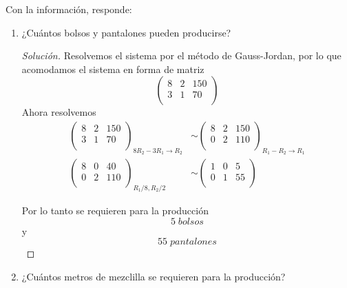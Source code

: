\documentclass[12pt]{article}
\newenvironment{solution}{\begin{proof}[Solución]}{\end{proof}}
\begin{document}
\begin{enumerate}
    Con la información, responde: 
    \vspace*{10mm}
    \begin{enumerate}
        \item ¿Cuántos bolsos y pantalones pueden producirse?
        \begin{solution}
            Resolvemos el sistema por el método de Gauss-Jordan, por lo que acomodamos el sistema en forma de matriz \[\left(\begin{array}{cc|c}  
                8 & 2 & 150 \\  
                3 & 1 & 70  \\ 
            \end{array}\right)\] Ahora resolvemos \begin{align*}
                \left(\begin{array}{cc|c}  
                    8 & 2 & 150 \\  
                    3 & 1 & 70  \\ 
                \end{array}\right)_{8R_2-3R_1 \rightarrow R_2} &\sim \left(\begin{array}{cc|c}  
                    8 & 2 & 150 \\  
                    0 & 2 & 110  \\ 
                \end{array}\right)_{R_1-R_2 \rightarrow R_1} \\
                \left(\begin{array}{cc|c}  
                    8 & 0 & 40 \\  
                    0 & 2 & 110  \\ 
                \end{array}\right)_{R_1/8, R_2/2} &\sim \left(\begin{array}{cc|c}  
                    1 & 0 & 5 \\  
                    0 & 1 & 55  \\ 
                \end{array}\right)
            \end{align*}

            Por lo tanto se requieren para la producción \[5 \; bolsos\] y \[55 \; pantalones\]
        \end{solution}
        \item ¿Cuántos metros de mezclilla se requieren para la producción? 
    \end{enumerate}


\end{enumerate}
\end{document}
